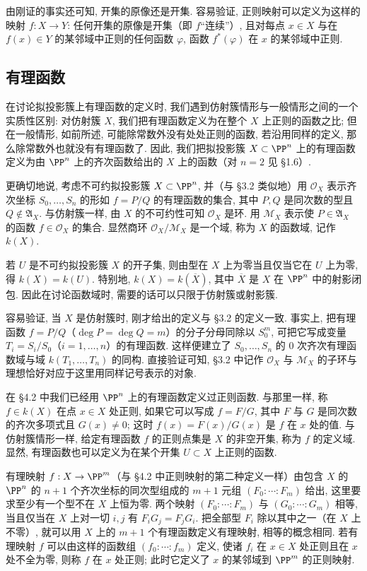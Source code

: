 由刚证的事实还可知, 开集的原像还是开集. 容易验证, 正则映射可以定义为这样的映射 $f: X \to Y$: 任何开集的原像是开集（即 $f$``连续''）, 且对每点 $x \in X$ 与在 $f(x) \in Y$ 的某邻域中正则的任何函数 $\varphi$, 函数 $f^*(\varphi)$ 在 $x$ 的某邻域中正则.

\subsection{有理函数}

在讨论拟投影簇上有理函数的定义时, 我们遇到仿射簇情形与一般情形之间的一个实质性区别: 对仿射簇 $X$, 我们把有理函数定义为在整个 $X$ 上正则的函数之比; 但在一般情形, 如前所述, 可能除常数外没有处处正则的函数, 若沿用同样的定义, 那么除常数外也就没有有理函数了. 因此, 我们把拟投影簇 $X \subset \PP^n$ 上的有理函数定义为由 $\PP^n$ 上的齐次函数给出的 $X$ 上的函数（对 $n = 2$ 见 §1.6）.

更确切地说, 考虑不可约拟投影簇 $X \subset \PP^n$, 并（与 §3.2 类似地）用 $\mathcal O_X$ 表示齐次坐标 $S_0, \ldots, S_n$ 的形如 $f = P/Q$ 的有理函数的集合, 其中 $P, Q$ 是同次数的型且 $Q \notin \mathfrak A_X$. 与仿射簇一样, 由 $X$ 的不可约性可知 $\mathcal O_X$ 是环. 用 $\mathcal M_X$ 表示使 $P \in \mathfrak A_X$ 的函数 $f \in \mathcal O_X$ 的集合. 显然商环 $\mathcal O_X / \mathcal M_X$ 是一个域, 称为 $X$ 的函数域, 记作 $k(X)$.

若 $U$ 是不可约拟投影簇 $X$ 的开子集, 则由型在 $X$ 上为零当且仅当它在 $U$ 上为零, 得 $k(X) = k(U)$. 特别地, $k(X) = k(\overline{X})$, 其中 $\overline{X}$ 是 $X$ 在 $\PP^n$ 中的射影闭包. 因此在讨论函数域时, 需要的话可以只限于仿射簇或射影簇.

容易验证, 当 $X$ 是仿射簇时, 刚才给出的定义与 §3.2 的定义一致. 事实上, 把有理函数 $f = P/Q$（$\deg P = \deg Q = m$）的分子分母同除以 $S_0^m$, 可把它写成变量 $T_i = S_i/S_0$（$i = 1, \ldots, n$）的有理函数. 这样便建立了 $S_0, \ldots, S_n$ 的 $0$ 次齐次有理函数域与域 $k(T_1, \ldots, T_n)$ 的同构. 直接验证可知, §3.2 中记作 $\mathcal O_X$ 与 $\mathcal M_X$ 的子环与理想恰好对应于这里用同样记号表示的对象.

在 §4.2 中我们已经用 $\PP^n$ 上的有理函数定义过正则函数. 与那里一样, 称 $f \in k(X)$ 在点 $x \in X$ 处正则, 如果它可以写成 $f = F/G$, 其中 $F$ 与 $G$ 是同次数的齐次多项式且 $G(x) \ne 0$; 这时 $f(x) = F(x)/G(x)$ 是 $f$ 在 $x$ 处的值. 与仿射簇情形一样, 给定有理函数 $f$ 的正则点集是 $X$ 的非空开集, 称为 $f$ 的定义域. 显然, 有理函数也可以定义为在某个开集 $U \subset X$ 上正则的函数.

有理映射 $f: X \to \PP^m$（与 §4.2 中正则映射的第二种定义一样）由包含 $X$ 的 $\PP^n$ 的 $n+1$ 个齐次坐标的同次型组成的 $m+1$ 元组 $(F_0 : \cdots : F_m)$ 给出, 这里要求至少有一个型不在 $X$ 上恒为零. 两个映射 $(F_0 : \cdots : F_m)$ 与 $(G_0 : \cdots : G_m)$ 相等, 当且仅当在 $X$ 上对一切 $i, j$ 有 $F_i G_j = F_j G_i$. 把全部型 $F_i$ 除以其中之一（在 $X$ 上不零）, 就可以用 $X$ 上的 $m+1$ 个有理函数定义有理映射, 相等的概念相同. 若有理映射 $f$ 可以由这样的函数组 $(f_0 : \cdots : f_m)$ 定义, 使诸 $f_i$ 在 $x \in X$ 处正则且在 $x$ 处不全为零, 则称 $f$ 在 $x$ 处正则; 此时它定义了 $x$ 的某邻域到 $\PP^m$ 的正则映射.

